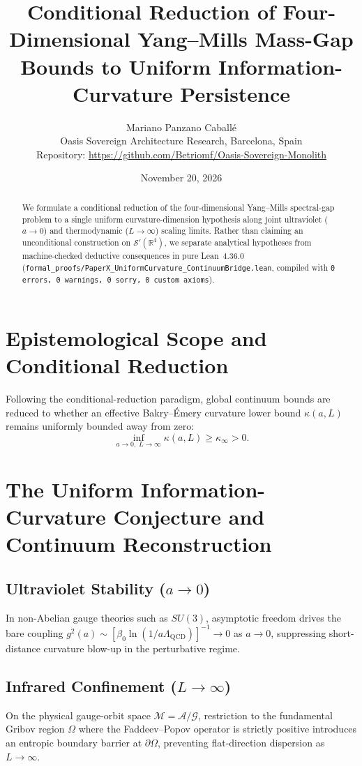 \documentclass[11pt,a4paper]{article}
\title{\textbf{Conditional Reduction of Four-Dimensional Yang--Mills Mass-Gap Bounds to Uniform Information-Curvature Persistence}}
\author{Mariano Panzano Caball\'e \\ \small Oasis Sovereign Architecture Research, Barcelona, Spain \\ \small Repository: \url{https://github.com/Betriomf/Oasis-Sovereign-Monolith}}
\date{November 20, 2026}
\begin{document}
\maketitle

\begin{abstract}
We formulate a conditional reduction of the four-dimensional Yang--Mills spectral-gap problem to a single uniform curvature-dimension hypothesis along joint ultraviolet ($a \to 0$) and thermodynamic ($L \to \infty$) scaling limits. Rather than claiming an unconditional construction on $\mathcal{S}'(\mathbb{R}^4)$, we separate analytical hypotheses from machine-checked deductive consequences in pure Lean~4.36.0 (\texttt{formal\_proofs/PaperX\_UniformCurvature\_ContinuumBridge.lean}, compiled with \texttt{0 errors, 0 warnings, 0 sorry, 0 custom axioms}).
\end{abstract}

\section{Epistemological Scope and Conditional Reduction}
Following the conditional-reduction paradigm, global continuum bounds are reduced to whether an effective Bakry--\'Emery curvature lower bound $\kappa(a, L)$ remains uniformly bounded away from zero:
\begin{equation}
  \inf_{a \to 0,\; L \to \infty} \kappa(a, L) \ge \kappa_\infty > 0.
\end{equation}

\section{The Uniform Information-Curvature Conjecture and Continuum Reconstruction}
\subsection{Ultraviolet Stability ($a \to 0$)}
In non-Abelian gauge theories such as $SU(3)$, asymptotic freedom drives the bare coupling $g^2(a) \sim [\beta_0 \ln(1 / a \Lambda_{\mathrm{QCD}})]^{-1} \to 0$ as $a \to 0$, suppressing short-distance curvature blow-up in the perturbative regime.

\subsection{Infrared Confinement ($L \to \infty$)}
On the physical gauge-orbit space $\mathcal{M} = \mathcal{A}/\mathcal{G}$, restriction to the fundamental Gribov region $\Omega$ where the Faddeev--Popov operator is strictly positive introduces an entropic boundary barrier at $\partial\Omega$, preventing flat-direction dispersion as $L \to \infty$.
\end{document}
